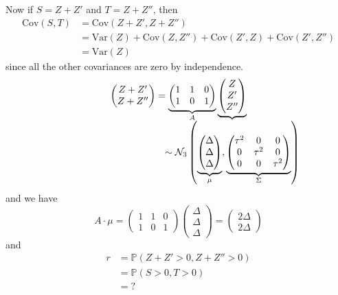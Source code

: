 \documentclass[a4paper,12pt]{amsart}
\newcommand{\Var}{\mbox{Var}}
\newcommand{\Cov}{\mbox{Cov}}
\newcommand{\p}[1]{\mathbb{P}\left(#1\right)}
\begin{document}
Now if $S = Z + Z'$ and $T = Z + Z''$, then
\begin{align*}
\Cov(S,T) &= \Cov(Z + Z' , Z + Z'')\\
&= \Var(Z) + \Cov(Z,Z'') + \Cov(Z',Z) + \Cov(Z',Z'')\\
&= \Var(Z)
\end{align*}
since all the other covariances are zero by independence.
\[\begin{pmatrix}
Z + Z'\\ Z+ Z''
\end{pmatrix} =\underbrace{\begin{pmatrix}
1 & 1 & 0 \\ 1 & 0 & 1
\end{pmatrix}}_{A} \underbrace{\begin{pmatrix}
Z \\ Z' \\ Z''
\end{pmatrix}}_{\mathclap{\displaystyle \sim \mathcal{N}_3\left(
\underbrace{
\begin{pmatrix}
\Delta\\ \Delta \\ \Delta
\end{pmatrix}}_{\mu}
,
\underbrace{
\begin{pmatrix}
\tau^2 & 0 & 0 \\
0 & \tau^2 & 0 \\
0 & 0 & \tau^2
\end{pmatrix}}_{\Sigma}
 \right)}} \]
 and we have 
\[A\cdot \mu =
\begin{pmatrix}
1 & 1 & 0 \\ 1 & 0 & 1
\end{pmatrix}\begin{pmatrix}
\Delta \\ \Delta \\ \Delta
\end{pmatrix} = \begin{pmatrix}
2 \Delta \\ 2 \Delta
\end{pmatrix} \]
and
\begin{align*}
r &= \p{Z + Z' >0, Z + Z'' >0}\\
&= \p{S>0, T>0}\\
&=?
\end{align*}
\end{document}
